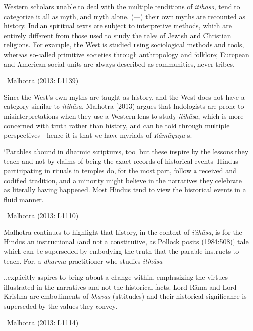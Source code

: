 \begin{myquote}
Western scholars unable to deal with the multiple renditions of \textit{itihāsa}, tend to categorize it all as myth, and myth alone. (---) their own myths are recounted as history. Indian spiritual texts are subject to interpretive methods, which are entirely different from those used to study the tales of Jewish and Christian religions. For example, the West is studied using sociological methods and tools, whereas so-called primitive societies through anthropology and folklore; European and American social units are always described as communities, never tribes.

~\hfill Malhotra (2013: L1139)
\end{myquote}

Since the West’s own myths are taught as history, and the West does not have a category similar to \textit{itihāsa}, Malhotra (2013) argues that Indologists are prone to misinterpretations when they use a Western lens to study \textit{itihāsa}, which is more concerned with truth rather than history, and can be told through multiple perspectives - hence it is that we have myriads of \textit{Rāmāyaṇa}-s.

\begin{myquote}
‘Parables abound in dharmic scriptures, too, but these inspire by the lessons they teach and not by claims of being the exact records of historical events. Hindus participating in rituals in temples do, for the most part, follow a received and codified tradition, and a minority might believe in the narratives they celebrate as literally having happened. Most Hindus tend to view the historical events in a fluid manner.

~\hfill Malhotra (2013: L1110)
\end{myquote}

Malhotra continues to highlight that history, in the context of \textit{itihāsa}, is for the Hindus an instructional (and not a constitutive, as Pollock posits (1984:508)) tale which can be superseded by embodying the truth that the parable instructs to teach. For, a \textit{dharma} practitioner who studies \textit{itihāsa} -

\begin{myquote}
..explicitly aspires to bring about a change within, emphasizing the virtues illustrated in the narratives and not the historical facts. Lord Rāma and Lord Krishna are embodiments of \textit{bhavas} (attitudes) and their historical significance is superseded by the values they convey.

~\hfill Malhotra (2013: L1114)
\end{myquote}

